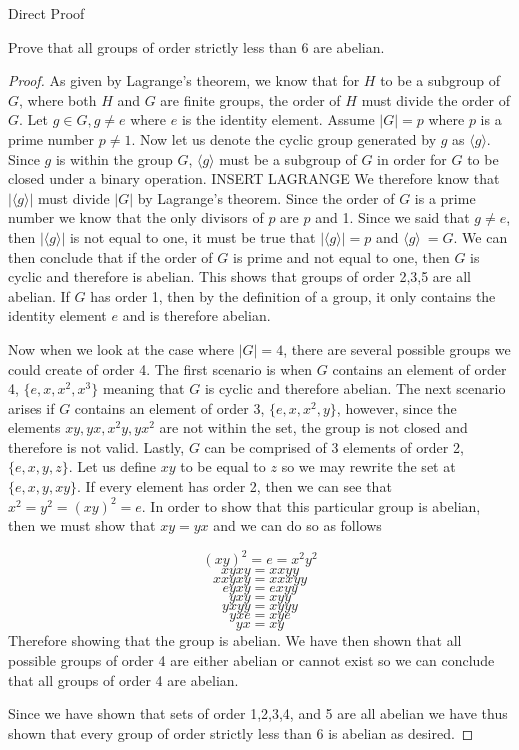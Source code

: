 Direct Proof

Prove that all groups of order strictly less than $6$ are abelian.

\begin{proof}
As given by Lagrange's theorem, we know that for $H$ to be a subgroup of $G$, where both $H$ and $G$ are finite groups, the order of $H$ must divide the order of $G$. Let $g\in G, g \neq e$ where $e$ is the identity element. Assume $|G| = p$ where $p$ is a prime number $p \neq 1$. Now let us denote the cyclic group generated by $g$ as $\langle g \rangle$. Since $g$ is within the group $G$, $\langle g \rangle$ must be a subgroup of $G$ in order for $G$ to be closed under a binary operation. INSERT LAGRANGE We therefore know that $|\langle g \rangle|$ must divide $|G|$ by Lagrange's theorem. Since the order of $G$ is a prime number we know that the only divisors of $p$ are $p$ and 1. Since we said that $ g \neq e$, then $|\langle g \rangle|$ is not equal to one, it must be true that $|\langle g \rangle| = p$ and $\langle g \rangle \ = G$. We can then conclude that if the order of $G$ is prime and not equal to one, then $G$ is cyclic and therefore is abelian. This shows that groups of order 2,3,5 are all abelian. If $G$ has order 1, then by the definition of a group, it only contains the identity element $e$ and is therefore abelian. 


Now when we look at the case where $|G| = 4$, there are several possible groups we could create of order 4. The first scenario is when $G$ contains an element of order 4, $\{ e, x, x^2, x^3 \}$ meaning that $G$ is cyclic and therefore abelian. The next scenario arises if $G$ contains an element of order 3, $\{ e, x, x^2, y \}$, however, since the elements $xy, yx, x^2y, yx^2$ are not within the set, the group is not closed and therefore is not valid. Lastly, $G$ can be comprised of 3 elements of order 2, $\{ e, x, y, z \}$. Let us define $xy$ to be equal to $z$ so we may rewrite the set at $\{ e, x, y, xy \}$. If every element has order 2, then we can see that $x^2 = y^2 = (xy)^2 = e$. In order to show that this particular group is abelian, then we must show that $xy = yx$ and we can do so as follows

$$(xy)^2  = e = x^2y^2$$
$$ xyxy=xxyy$$
$$ xxyxy =xxxyy$$
$$ eyxy = exyy$$
$$ yxy = xyy$$
$$ yxyy = xyyy$$
$$ yxe = xye$$
$$yx = xy $$
Therefore showing that the group is abelian. We have then shown that all possible groups of order 4 are either abelian or cannot exist so we can conclude that all groups of order 4 are abelian.

Since we have shown that sets of order 1,2,3,4, and 5 are all abelian we have thus shown that every group of order strictly less than $6$ is abelian as desired.
\end{proof}